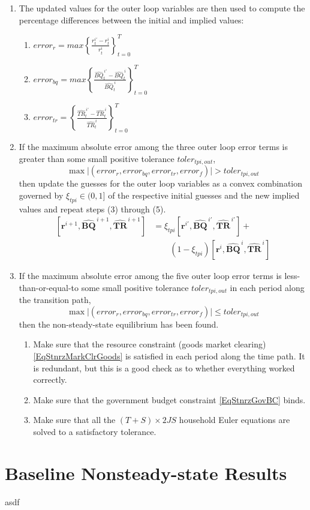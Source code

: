 \begin{enumerate}
\begin{enumerate}
	\end{enumerate}
	\item The updated values for the outer loop variables are then used to compute the percentage differences between the initial and implied values:
		\begin{enumerate}
			\item $error_r = max\left\{\frac{r_{t}^{i'} - r_{t}^i}{r_{t}^i}\right\}_{t=0}^{T}$
			\item $error_{bq} =  max\left\{\frac{\hat{BQ}_{t}^{\,i'} - \hat{BQ}_{t}^{\,i}}{\hat{BQ}_{t}^{\,i}}\right\}_{t=0}^{T}$
			\item $error_{tr} = \left\{\frac{\hat{TR}_{t}^{\,i'} - \hat{TR}_{t}^{\,i}}{\hat{TR}_{t}^{\,i}}\right\}_{t=0}^{T}$
		\end{enumerate}
	\item If the maximum absolute error among the three outer loop error terms is greater than some small positive tolerance $toler_{tpi,out}$,
		\begin{equation*}
			\max\big|\left(error_r,error_{bq},error_{tr},error_f\right)\bigr| > toler_{tpi,out}
		\end{equation*}
	then update the guesses for the outer loop variables as a convex combination governed by $\xi_{tpi}\in(0,1]$ of the respective initial guesses and the new implied values and repeat steps (3) through (5).
	\begin{equation*}
		\begin{split}
			\left[\bm{r}^{i+1},\bm{\hat{BQ}}^{\,i+1},\bm{\hat{TR}}^{\,i+1}\right] &= \xi_{tpi}\left[\bm{r}^{i'},\bm{\hat{BQ}}^{\,i'},\bm{\hat{TR}}^{\,i'}\right] + \\
			&\qquad(1-\xi_{tpi})\left[\bm{r}^{i},\bm{\hat{BQ}}^{\,i},\bm{\hat{TR}}^{\,i}\right]
		\end{split}
	\end{equation*}
	\item If the maximum absolute error among the five outer loop error terms is less-than-or-equal-to some small positive tolerance $toler_{tpi,out}$ in each period along the transition path,
		\begin{equation*}
			\max\big|\left(error_r,error_{bq},error_{tr},error_f\right)\bigr| \leq toler_{tpi,out}
		\end{equation*}
	then the non-steady-state equilibrium has been found.
		\begin{enumerate}
			\item Make sure that the resource constraint (goods market clearing) \eqref{EqStnrzMarkClrGoods} is satisfied in each period along the time path. It is redundant, but this is a good check as to whether everything worked correctly.
			\item Make sure that the government budget constraint \eqref{EqStnrzGovBC} binds.
			\item Make sure that all the $(T+S)\times2JS$ household Euler equations are solved to a satisfactory tolerance.
		\end{enumerate}
  \end{enumerate}

  \renewcommand\theenumi{\roman{enumi}}


\section{Baseline Nonsteady-state Results}\label{SecNSSeqlbResults}

  asdf
